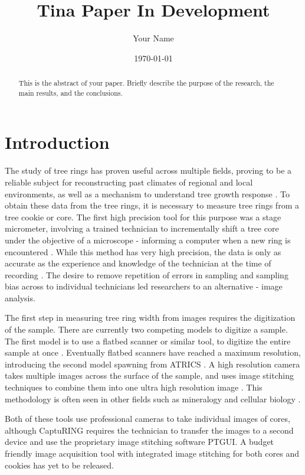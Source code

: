 \documentclass[a4paper,12pt]{article}
\title{Tina Paper In Development}
\author{Your Name}
\date{\today}
\begin{document}
\maketitle

\begin{abstract}
    This is the abstract of your paper. Briefly describe the purpose of the research, the main results, and the conclusions.
\end{abstract}

\section{Introduction}
The study of tree rings has proven useful across multiple fields, proving to be a reliable subject for reconstructing past climates of regional and local environments, as well as a mechanism to understand tree growth response \citep{fritts_dendroclimatology_1971} \citep{williams_using_2010} \citep{guibal_dendrochronology_2021} \citep{sheppard_dendroclimatology_2010}.
To obtain these data from the tree rings, it is necessary to measure tree rings from a tree cookie or core. The first high precision tool for this purpose was a stage micrometer, involving a trained technician to incrementally shift a tree core under the objective of a microscope - informing a computer when a new ring is encountered \citep{robinson_microcomputer_nodate}.
While this method has very high precision, the data is only as accurate as the experience and knowledge of the technician at the time of recording \citep{levanic_atrics_2007}.
The desire to remove repetition of errors in sampling and sampling bias across to individual technicians led researchers to an alternative - image analysis. 
\par
The first step in measuring tree ring width from images requires the digitization of the sample. There are currently two competing models to digitize a sample. The first model is to use a flatbed scanner or similar tool, to digitize the entire sample at once \citep{guay_new_1992}.
Eventually flatbed scanners have reached a maximum resolution, introducing the second model spawning from ATRICS \citep{levanic_atrics_2007}. A high resolution camera takes multiple images across the surface of the sample, and uses image stitching techniques to combine them into one ultra high resolution image \citep{muhlich_stitching_2022}.
This methodology is often seen in other fields such as mineralogy and cellular biology \citep{ro_image_2021,mohammadi_fast_2024}. 


Both of these tools use professional cameras to take individual images of cores, although CaptuRING requires the technician to transfer the images to a second device and use the proprietary image stitching software PTGUI. 
A budget friendly image acquisition tool with integrated image stitching for both cores and cookies has yet to be released.   
\end{document}
